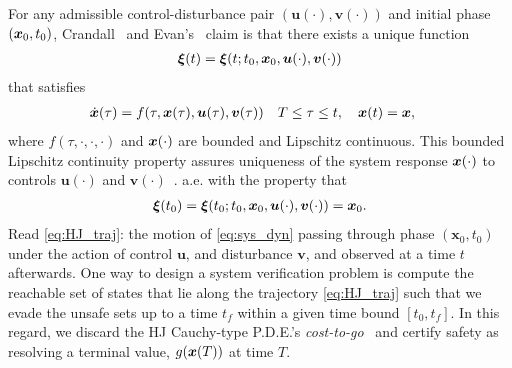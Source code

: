 For any admissible control-disturbance pair $(\bm{u}(\cdot), \bm{v}(\cdot))$ and initial phase $(\bm{x}_0, t_0)$, Crandall~\cite{Crandall1983viscosity} and Evan's~\cite{Evans1984} claim is that there exists a unique function %
%
\begin{align}
	\bm{\xi}(t) = \bm{\xi}(t; t_0, \bm{x}_0, \bm{u}(\cdot), \bm{v}(\cdot))
	\label{eq:HJ_traj}
\end{align}
%
that satisfies 
%
\begin{subequations}
	\begin{align}
		\dot{\bm{x}}(\tau) &= f(\tau, \bm{x}(\tau), \bm{u}(\tau), \bm{v}(\tau)) \quad T \le \tau \le t, \quad \bm{x}(t) = \bm{x},
	\end{align}
	\label{eq:sys_dyn}
\end{subequations}
%
\noindent where $f(\tau, \cdot, \cdot, \cdot)$ and $\bm{x}(\cdot)$ are bounded and Lipschitz continuous. This bounded Lipschitz continuity property assures uniqueness of the system response $\bm{x}(\cdot)$ to controls $\bm{u}(\cdot)$ and $\bm{v}(\cdot)$~\cite{Souganidis}. 
%
a.e. with the property that
%
\begin{align}
	\bm{\xi}(t_0) = \bm{\xi}(t_0; t_0, \bm{x}_0, \bm{u}(\cdot), \bm{v}(\cdot)) = \bm{x}_0.
\end{align}
%
Read \eqref{eq:HJ_traj}: the motion of \eqref{eq:sys_dyn} passing through phase $(\bm{x}_0, t_0)$ under the action of control $\bm{u}$, and disturbance $\bm{v}$, and observed at a time $t$ afterwards. One way to design a system verification problem is compute the reachable set of states that lie along the trajectory \eqref{eq:HJ_traj} such that we evade the unsafe sets up to a time \eg $t_f$ within a given time bound \eg $\left[t_0, t_f\right]$. In this regard, we discard the HJ Cauchy-type P.D.E.'s \textit{cost-to-go}~\cite{Evans1984} and certify safety as resolving a terminal value, $g(\bm{x}(T))$ at time $T$.

